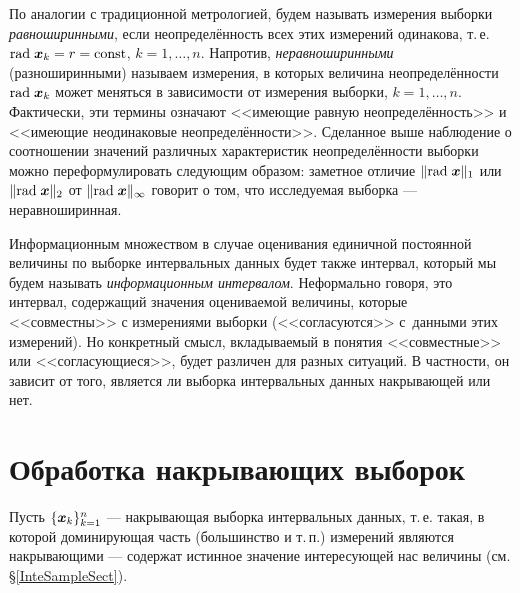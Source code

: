 \documentclass[a5paper,openany]{book}
\newcommand{\mbf}[1]{\protect\text{\boldmath$#1$}}
\newcommand{\const}{\mathrm{const}}
\renewcommand{\r}{\mathrm{rad}\;}
\begin{document}
По аналогии с традиционной метрологией, будем называть измерения выборки 
\textit{равноширинными}, если неопределённость всех этих измерений одинакова, т.\,е. 
$\r\mbf{x}_k = r = \const$, $k = 1,\ldots,n$. Напротив, \textit{неравноширинными} 
(разноширинными) называем измерения, в которых величина неопределённости $\r\mbf{x}_k$ 
может меняться в зависимости от измерения выборки, $k = 1,\ldots, n$. Фактически, эти 
термины  означают  <<имеющие равную неопределённость>>  и  <<имеющие неодинаковые 
неопределённости>>.  
Сделанное выше наблюдение о соотношении значений различных характеристик 
неопределённости выборки можно переформулировать следующим образом: заметное отличие 
$\|\r\mbf{x}\|_{1}$ или $\|\r\mbf{x}\|_{2}$ от $\|\r\mbf{x}\|_\infty$ говорит о том, 
что исследуемая выборка --- неравноширинная. 
    
Информационным множеством в случае оценивания единичной постоянной величины по выборке 
интервальных данных будет также интервал, который мы будем называть \emph{информационным 
интервалом}. Неформально говоря, это интервал, содержащий значения оцениваемой величины, 
которые <<совместны>> с измерениями выборки (<<согласуются>> с~данными этих измерений). 
Но конкретный смысл, вкладываемый в понятия <<совместные>> или <<согласующиеся>>, будет 
различен для разных ситуаций. В частности, он зависит от того, является ли выборка  
интервальных данных накрывающей или нет.         
   
   

\section{Обработка накрывающих выборок} 
\label{CoverSampleProcSect} 
  
  
Пусть $\{\mbf{x}_{k}\}_{k=1}^{n}$ --- накрывающая выборка интервальных данных, 
т.\,е. такая, в которой доминирующая часть (большинство и т.\,п.) измерений 
являются накрывающими --- содержат истинное значение интересующей нас величины 
(см. \S\ref{InteSampleSect}). 
  
\end{document}
